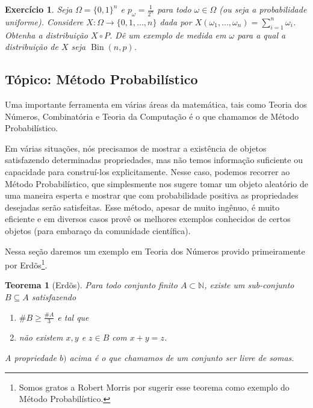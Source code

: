 \documentclass[reqno, final]{book}
\newcommand*\1{\mathds{1}}
\newtheorem{theorem}{Teorema}[section]
\newtheorem{exercise}[example]{Exercício}
\DeclareMathOperator{\Bin}{Bin}
\newcommand{\todosec}[2]{\ifdraft{\vfill \pagebreak \subsection{#1} #2 \vfill \pagebreak}{}}
\begin{document}
\begin{exercise}
  Seja $\Omega = \{0,1\}^n$ e $p_\omega = \tfrac 1{2^n}$ para todo $\omega \in \Omega$ (ou seja a probabilidade uniforme).
  Considere $X: \Omega \to \{0,1, \dots, n\}$ dada por $X(\omega_1, \dots, \omega_n) = \sum_{i=1}^n \omega_i$.
  Obtenha a distribuição $X \circ P$.
  Dê um exemplo de medida em $\omega$ para a qual a distribuição de $X$ seja $\Bin(n,p)$.
\end{exercise}


\vfill
\pagebreak

\subsection{Tópico: Método Probabilístico}



Uma importante ferramenta em várias áreas da matemática, tais como Teoria dos Números, Combinatória e Teoria da Computação é o que chamamos de Método Probabilístico. 

Em várias situações, nós precisamos de mostrar a existência de objetos satisfazendo determinadas propriedades, mas não temos informação suficiente ou capacidade para construí-los explicitamente.
Nesse caso, podemos recorrer ao Método Probabilístico, que simplesmente nos sugere tomar um objeto aleatório de uma maneira esperta e mostrar que com probabilidade positiva as propriedades desejadas serão satisfeitas.
Esse método, apesar de muito ingênuo, é muito eficiente e em diversos casos provê os melhores exemplos conhecidos de certos objetos (para embaraço da comunidade científica).

Nessa seção daremos um exemplo em Teoria dos Números provido primeiramente por Erdõs\footnote{Somos gratos a Robert Morris por sugerir esse teorema como exemplo do Método Probabilístico.}.

\begin{theorem}[Erdös]
  Para todo conjunto finito $A \subset \mathbb{N}$, existe um sub-conjunto $B \subseteq A$ satisfazendo
  \begin{enumerate}[\quad a)]
  \item $\# B \geq \frac{\#A}{3}$ e tal que
  \item não existem $x, y$ e $z \in B$ com $x + y = z$.
  \end{enumerate}
  A propriedade $b)$ acima é o que chamamos de um conjunto ser livre de somas. 
\end{theorem}
\end{document}
